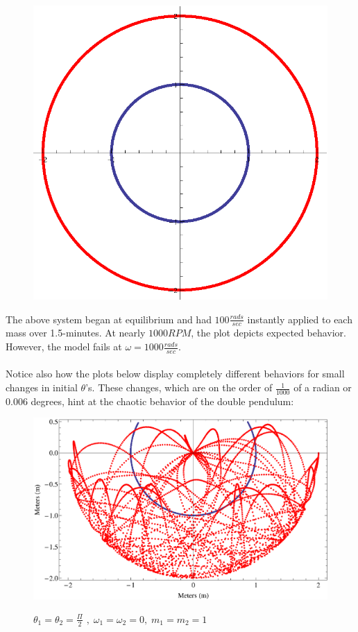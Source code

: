 \documentclass{report}
\begin{document}
\begin{enumerate}
\begin{figure}[H]
\includegraphics[scale=.5]{ideal.eps}
\label{fatEarth}
\end{figure}
The above system began at equilibrium and had $100\frac{rads}{sec}$ instantly applied to each mass over 1.5-minutes. At nearly $1000RPM$, the plot depicts expected behavior. However, the model fails at $\omega=1000\frac{rads}{sec}$. 
\\
\\Notice also how the plots below display completely different behaviors for small changes in initial $\theta$'s. These changes, which are on the order of $\frac{1}{1000}$ of a radian or $0.006$ degrees, hint at the chaotic behavior of the double pendulum:
\begin{figure}[H]
\centering \caption{$\displaystyle \theta_1=\theta_2=\frac{\Pi}{2}$ $,\;\omega_1=\omega_2=0,\; m_1=m_2=1$}
\includegraphics[scale=.37]{pihalves.eps}
\label{fatEarth}
\end{figure}


\end{enumerate}
\end{document}
